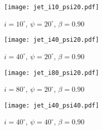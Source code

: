\documentclass[iop]{emulateapj}
\begin{document}



\pagebreak
\pagebreak

\clearpage

\begin{figure}
  \begin{center}
    \texttt{[image: jet\_i10\_psi20.pdf]}
  \end{center}
  \caption{$i=10^\circ$, $\psi=20^\circ$, $\beta=0.90$}
\end{figure}

\begin{figure}
  \begin{center}
    \texttt{[image: jet\_i40\_psi20.pdf]}
  \end{center}
  \caption{$i=40^\circ$, $\psi=20^\circ$, $\beta=0.90$}
\end{figure}

\begin{figure}
  \begin{center}
    \texttt{[image: jet\_i80\_psi20.pdf]}
  \end{center}
  \caption{$i=80^\circ$, $\psi=20^\circ$, $\beta=0.90$}
\end{figure}

\begin{figure}
  \begin{center}
    \texttt{[image: jet\_i40\_psi40.pdf]}
  \end{center}
  \caption{$i=40^\circ$, $\psi=40^\circ$, $\beta=0.90$}
\end{figure}



\end{document}
